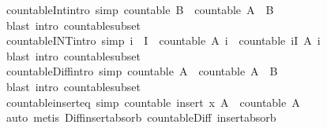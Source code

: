 \begin{isabellebody}
\endisatagproof
{\isafoldproof}%
%
\isadelimproof
\isanewline
%
\endisadelimproof
\isanewline
{}\isamarkupfalse%
\ countable{\isacharunderscore}Int{}{\isacharbrackleft}intro{\isacharcomma}\ simp{\isacharbrackright}{\isacharcolon}\ {\isachardoublequoteopen}countable\ B\ {\isasymLongrightarrow}\ countable\ {\isacharparenleft}A\ {\isasyminter}\ B{\isacharparenright}{\isachardoublequoteclose}\isanewline
%
\isadelimproof
\ \ %
\endisadelimproof
%
\isatagproof
{}\isamarkupfalse%
\ {\isacharparenleft}blast\ intro{\isacharcolon}\ countable{\isacharunderscore}subset{\isacharparenright}%
\endisatagproof
{\isafoldproof}%
%
\isadelimproof
\isanewline
%
\endisadelimproof
\isanewline
{}\isamarkupfalse%
\ countable{\isacharunderscore}INT{\isacharbrackleft}intro{\isacharcomma}\ simp{\isacharbrackright}{\isacharcolon}\ {\isachardoublequoteopen}i\ {\isasymin}\ I\ {\isasymLongrightarrow}\ countable\ {\isacharparenleft}A\ i{\isacharparenright}\ {\isasymLongrightarrow}\ countable\ {\isacharparenleft}{\isasymInter}i{\isasymin}I{\isachardot}\ A\ i{\isacharparenright}{\isachardoublequoteclose}\isanewline
%
\isadelimproof
\ \ %
\endisadelimproof
%
\isatagproof
{}\isamarkupfalse%
\ {\isacharparenleft}blast\ intro{\isacharcolon}\ countable{\isacharunderscore}subset{\isacharparenright}%
\endisatagproof
{\isafoldproof}%
%
\isadelimproof
\isanewline
%
\endisadelimproof
\isanewline
{}\isamarkupfalse%
\ countable{\isacharunderscore}Diff{\isacharbrackleft}intro{\isacharcomma}\ simp{\isacharbrackright}{\isacharcolon}\ {\isachardoublequoteopen}countable\ A\ {\isasymLongrightarrow}\ countable\ {\isacharparenleft}A\ {\isacharminus}\ B{\isacharparenright}{\isachardoublequoteclose}\isanewline
%
\isadelimproof
\ \ %
\endisadelimproof
%
\isatagproof
{}\isamarkupfalse%
\ {\isacharparenleft}blast\ intro{\isacharcolon}\ countable{\isacharunderscore}subset{\isacharparenright}%
\endisatagproof
{\isafoldproof}%
%
\isadelimproof
\isanewline
%
\endisadelimproof
\isanewline
{}\isamarkupfalse%
\ countable{\isacharunderscore}insert{\isacharunderscore}eq\ {\isacharbrackleft}simp{\isacharbrackright}{\isacharcolon}\ {\isachardoublequoteopen}countable\ {\isacharparenleft}insert\ x\ A{\isacharparenright}\ {\isacharequal}\ countable\ A{\isachardoublequoteclose}\isanewline
%
\isadelimproof
\ \ \ \ %
\endisadelimproof
%
\isatagproof
{}\isamarkupfalse%
\ auto\ {\isacharparenleft}metis\ Diff{\isacharunderscore}insert{\isacharunderscore}absorb\ countable{\isacharunderscore}Diff\ insert{\isacharunderscore}absorb{\isacharparenright}%

\end{isabellebody}

